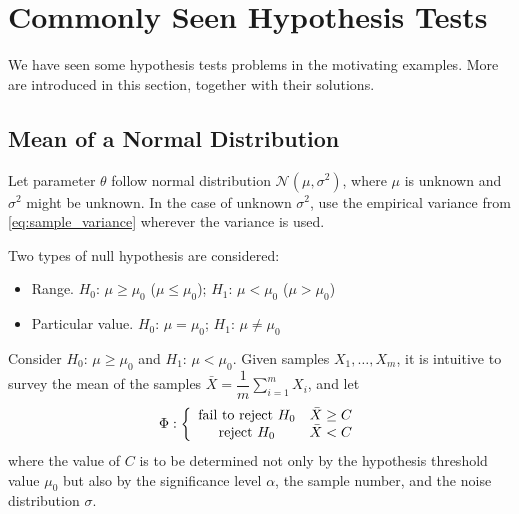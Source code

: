 \section{Commonly Seen Hypothesis Tests}

We have seen some hypothesis tests problems in the motivating examples. More are introduced in this section, together with their solutions.

\subsection{Mean of a Normal Distribution}

Let parameter $\theta$ follow normal distribution $\mathcal{N}(\mu,\sigma^2)$, where $\mu$ is unknown and $\sigma^2$ might be unknown. In the case of unknown $\sigma^2$, use the empirical variance from \eqref{eq:sample_variance} wherever the variance is used.

Two types of null hypothesis are considered:
\begin{itemize}
	\item Range. $H_0$: $\mu \geq \mu_0$ ($\mu \leq \mu_0$); $H_1$: $\mu < \mu_0$ ($\mu > \mu_0$)
	\item Particular value. $H_0$: $\mu = \mu_0$; $H_1$: $\mu \neq \mu_0$
\end{itemize}

Consider $H_0$: $\mu \geq \mu_0$ and  $H_1$: $\mu < \mu_0$. Given samples $X_1,\ldots,X_m$, it is intuitive to survey the mean of the samples $\bar{X}=\dfrac{1}{m}\sum_{i=1}^{m}X_i$, and let
\begin{eqnarray}
	\Phi : \left\{\begin{array}{cc}
		\textup{fail to reject~} H_0 & \bar{X} \geq C \\
		\textup{reject~} H_0 & \bar{X} < C
	\end{array}\right. \label{eq:hypotest_normal_1}
\end{eqnarray}
where the value of $C$ is to be determined not only by the hypothesis threshold value $\mu_0$ but also by the significance level $\alpha$, the sample number, and the noise distribution $\sigma$. 

